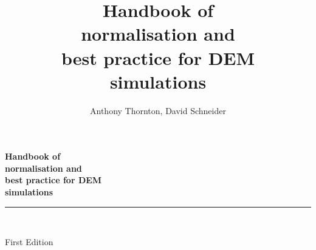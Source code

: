 \documentclass[11pt, a4paper]{book}
\title{Handbook of \\ normalisation and \\ best practice for DEM \\ simulations}
\author{Anthony Thornton, David Schneider}
\newcommand{\booksubtitle}{Open Network on DEM Simulations  (ON-DEM)}
\begin{document}
\frontmatter

\begin{titlepage}
\begin{flushleft}

\textbf{\fontsize{28}{34}\selectfont Handbook of \\ normalisation and \\ best practice for DEM \\ simulations}

\par\noindent\rule{\textwidth}{4pt}\\


\begin{flushright}
\Large First Edition
\end{flushright}

\vspace{\fill}

\end{flushleft}
\end{titlepage}
\restoregeometry


\thispagestyle{empty}
\end{document}
